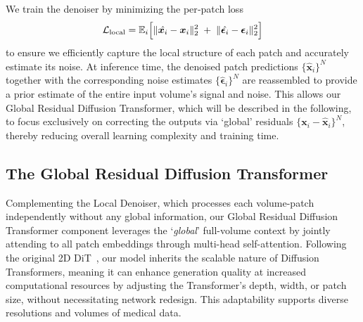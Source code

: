 
We train the denoiser by minimizing the per‐patch loss
\begin{equation}\label{eq:local_loss}
  \mathcal{L}_\mathrm{local}
  = \mathbb{E}_{i}\Bigl[\|\hat{\boldsymbol{x}_i} - \boldsymbol{x}_i\|_2^2
    \;+\;\|\hat{\boldsymbol{\epsilon}_i} - \boldsymbol{\epsilon}_i\|_2^2\Bigr]
\end{equation}
to ensure we efficiently capture the local structure of each patch and accurately estimate its noise. 
At inference time, the denoised patch predictions $\{\hat{\boldsymbol{x}}_i\}^N$ together with the corresponding noise estimates $\{\hat{\boldsymbol{\epsilon}}_i\}^N$ are reassembled to provide a prior estimate of the entire input volume's signal and noise. This allows our Global Residual Diffusion Transformer, which will be described in the following, to focus exclusively on correcting the outputs via `global' residuals $\{\boldsymbol{x}_i - \hat{\boldsymbol{x}}_i\}^N$, thereby reducing overall learning complexity and training time.


\subsection{The Global Residual Diffusion Transformer}
\label{m2}
Complementing the Local Denoiser, which processes each volume-patch independently without any global information, our Global Residual Diffusion Transformer component leverages the `\emph{global}' full-volume context by jointly attending to all patch embeddings through multi-head self-attention. Following the original 2D DiT~\citep{Peebles2022DiT}, our model inherits the scalable nature of Diffusion Transformers, meaning it can enhance generation quality at increased computational resources by adjusting the Transformer’s depth, width, or patch size, without necessitating network redesign. This adaptability supports diverse resolutions and volumes of medical data.

